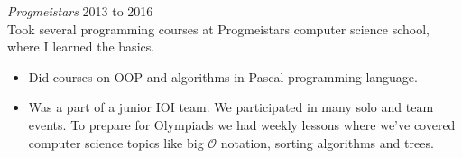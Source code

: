 \documentclass[margin, 10pt]{res} %
\begin{document}
\begin{resume}
{\sl Progmeistars} \hfill 2013 to 2016\\
Took several programming courses at Progmeistars computer science school, where I learned the basics.

\begin{itemize} \itemsep -2pt
\item Did courses on OOP and algorithms in Pascal programming language.
\item Was a part of a junior IOI team. We participated in many solo and team events. To prepare for Olympiads we had weekly lessons where we've covered computer science topics like big $\mathcal{O}$ notation, sorting algorithms and trees.
\end{itemize}

\end{resume}
\end{document}
